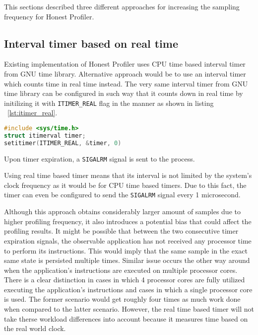 \documentclass[..thesis.tex]{subfiles}
\begin{document}
This sections described three different approaches for increasing the sampling frequency for Honest Profiler.

\subsection{Interval timer based on real time}
Existing implementation of Honest Profiler uses CPU time based interval timer from GNU time library. Alternative approach would be to use an interval timer which counts time in real time instead. The very same interval timer from GNU time library can be configured in such way that it counts down in real time by initilizing it with \texttt{ITIMER\_REAL} flag in the manner as shown in listing ~\ref{lst:itimer_real}.

\begin{lstlisting}[language=C++,style=def,label={lst:itimer_real}, caption={Timer initialization based on real time}]
#include <sys/time.h>
struct itimerval timer;
setitimer(ITIMER_REAL, &timer, 0)
\end{lstlisting}

Upon timer expiration, a \texttt{SIGALRM} signal is sent to the process.\cite{getitimer2}

Using real time based timer means that its interval is not limited by the system's clock frequency as it would be for CPU time based timers. Due to this fact, the timer can even be configured to send the \texttt{SIGALRM} signal every 1 microsecond.

Although this approach obtains considerably larger amount of samples due to higher profiling frequency, it also introduces a potential bias that could affect the profiling results. It might be possible that between the two consecutive timer expiration signals, the observable application has not received any processor time to perform its instructions. This would imply that the same sample in the exact same state is persisted multiple times. Similar issue occurs the other way around when the application's instructions are executed on multiple processor cores. There is a clear distinction in cases in which 4 processor cores are fully utilized executing the application's instructions and cases in which a single processor core is used. The former scenario would get roughly four times as much work done when compared to the latter scenario. However, the real time based timer will not take therse workload differences into account because it measures time based on the real world clock.
\end{document}
